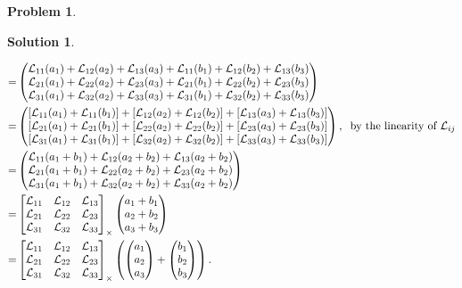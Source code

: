 \documentclass{book}
\theoremstyle{definition}
\newtheorem*{prob*}{Problem}
\newtheorem*{sln*}{Solution}
\newcommand{\lag}{\mathcal{L}}
\begin{document}
\begin{prob*}
\begin{sln*}
\begin{enumerate}
\begin{enumerate}
\begin{align*}
			=
			& \begin{pmatrix}
			\lag_{11}(a_1) + \lag_{12}(a_2) + \lag_{13}(a_3) + \lag_{11}(b_1) + \lag_{12}(b_2) + \lag_{13}(b_3)\\
			\lag_{21}(a_1) + \lag_{22}(a_2) + \lag_{23}(a_3) + \lag_{21}(b_1) + \lag_{22}(b_2) + \lag_{23}(b_3)\\
			\lag_{31}(a_1) + \lag_{32}(a_2) + \lag_{33}(a_3) + \lag_{31}(b_1) + \lag_{32}(b_2) + \lag_{33}(b_3)
			\end{pmatrix}\\
			=
			& \begin{pmatrix}
			[\lag_{11}(a_1) + \lag_{11}(b_1)] + [\lag_{12}(a_2) + \lag_{12}(b_2)] + [\lag_{13}(a_3) + \lag_{13}(b_3)]\\
			[\lag_{21}(a_1) + \lag_{21}(b_1)] + [\lag_{22}(a_2) + \lag_{22}(b_2)] + [\lag_{23}(a_3) + \lag_{23}(b_3)]\\
			[\lag_{31}(a_1) + \lag_{31}(b_1)] + [\lag_{32}(a_2) + \lag_{32}(b_2)] + [\lag_{33}(a_3) + \lag_{33}(b_3)]
			\end{pmatrix}, \hspace{0.2cm} \text{by the linearity of $\lag_{ij}$}\\
			=
			& \begin{pmatrix}
			\lag_{11}(a_1 + b_1) + \lag_{12}(a_2 + b_2) + \lag_{13}(a_2 + b_2)\\
			\lag_{21}(a_1 + b_1) + \lag_{22}(a_2 + b_2) + \lag_{23}(a_2 + b_2)\\
			\lag_{31}(a_1 + b_1) + \lag_{32}(a_2 + b_2) + \lag_{33}(a_2 + b_2)
			\end{pmatrix}\\
			=
			& \begin{bmatrix}
			\lag_{11} & \lag_{12} & \lag_{13}\\
			\lag_{21} & \lag_{22} & \lag_{23}\\
			\lag_{31} & \lag_{32} & \lag_{33}
			\end{bmatrix}_\times 
			\begin{pmatrix}
			a_1 + b_1\\a_2 + b_2\\a_3 + b_3
			\end{pmatrix}\\
			=
			& \begin{bmatrix}
			\lag_{11} & \lag_{12} & \lag_{13}\\
			\lag_{21} & \lag_{22} & \lag_{23}\\
			\lag_{31} & \lag_{32} & \lag_{33}
			\end{bmatrix}_\times
			\left( 
			\begin{pmatrix}
			a_1\\a_2\\a_3
			\end{pmatrix}
			+
			\begin{pmatrix}
			b_1\\b_2\\b_3
			\end{pmatrix}
			\right).
			\end{align*}  
			

\end{enumerate}
\end{enumerate}
\end{sln*}
\end{prob*}
\end{document}

